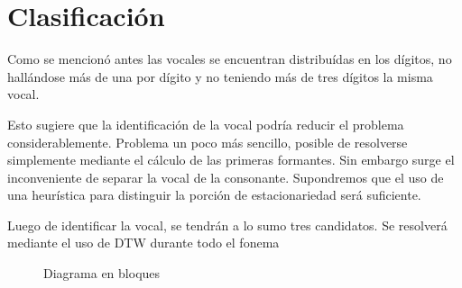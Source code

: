 \documentclass[a4paper]{article}
\begin{document}
	\section{Clasificación}
		Como se mencionó antes las vocales se encuentran
		distribuídas en los dígitos, no hallándose más de
		una por dígito y no teniendo más de tres dígitos la
		misma vocal.

		Esto sugiere que la identificación de la vocal podría
		reducir el problema considerablemente.	Problema un poco
		más sencillo, posible de resolverse simplemente mediante
		el cálculo de las primeras formantes.	Sin embargo surge
		el inconveniente de separar la vocal de la consonante.
		Supondremos que el uso de una heurística para distinguir
		la porción de estacionariedad será suficiente.

		Luego de identificar la vocal, se tendrán a lo sumo
		tres candidatos.  Se resolverá mediante el uso de DTW
		durante todo el fonema

		\begin{figure}
			
			\caption{Diagrama en bloques}
		\end{figure}

		
	
\end{document}
